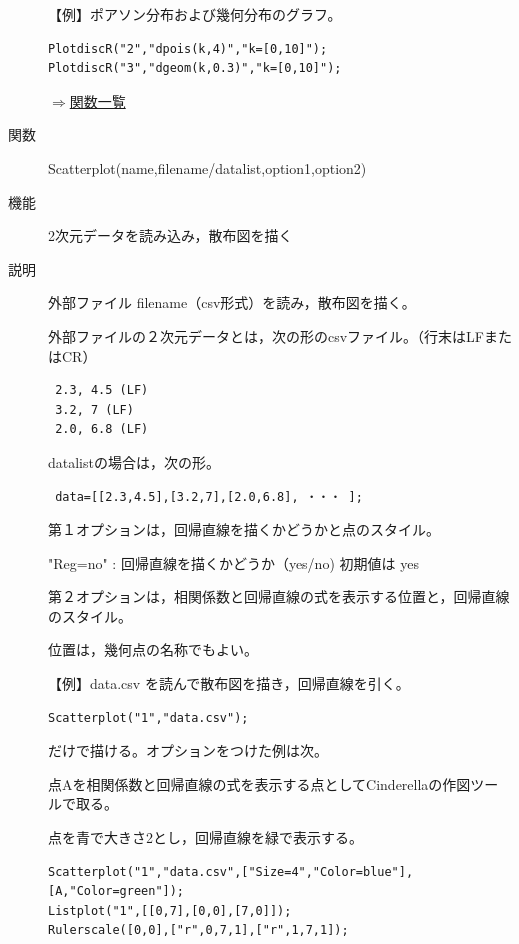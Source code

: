 \documentclass[papersize,a4paper,10pt,uplatex]{jsarticle}
\begin{document}
\begin{description}
【例】ポアソン分布および幾何分布のグラフ。
\begin{verbatim}
PlotdiscR("2","dpois(k,4)","k=[0,10]");
PlotdiscR("3","dgeom(k,0.3)","k=[0,10]");
\end{verbatim}
\begin{flushright}\hyperlink{functionlist}{$\Rightarrow$関数一覧}\end{flushright}

\vspace{\baselineskip}
\hypertarget{scatterplot}{}
\item[関数]Scatterplot(name,filename/datalist,option1,option2)
\item[機能]2次元データを読み込み，散布図を描く
\item[説明]外部ファイル filename（csv形式）を読み，散布図を描く。

外部ファイルの２次元データとは，次の形のcsvファイル。（行末はLFまたはCR）
\begin{verbatim}
 2.3, 4.5 (LF)
 3.2, 7 (LF)
 2.0, 6.8 (LF)
\end{verbatim}


datalistの場合は，次の形。

\begin{verbatim}
 data=[[2.3,4.5],[3.2,7],[2.0,6.8], ・・・ ];
\end{verbatim}


第１オプションは，回帰直線を描くかどうかと点のスタイル。

"Reg=no" : 回帰直線を描くかどうか（yes/no) 初期値は yes

第２オプションは，相関係数と回帰直線の式を表示する位置と，回帰直線のスタイル。

位置は，幾何点の名称でもよい。

\vspace{\baselineskip}
【例】data.csv を読んで散布図を描き，回帰直線を引く。
\begin{verbatim}
Scatterplot("1","data.csv");
\end{verbatim}

だけで描ける。オプションをつけた例は次。

点Aを相関係数と回帰直線の式を表示する点としてCinderellaの作図ツールで取る。

点を青で大きさ2とし，回帰直線を緑で表示する。

\begin{verbatim}
Scatterplot("1","data.csv",["Size=4","Color=blue"],[A,"Color=green"]);
Listplot("1",[[0,7],[0,0],[7,0]]);
Rulerscale([0,0],["r",0,7,1],["r",1,7,1]);
\end{verbatim}
 
\vspace{\baselineskip}
 \begin{center}  \end{center}

\end{description}
\end{document}
